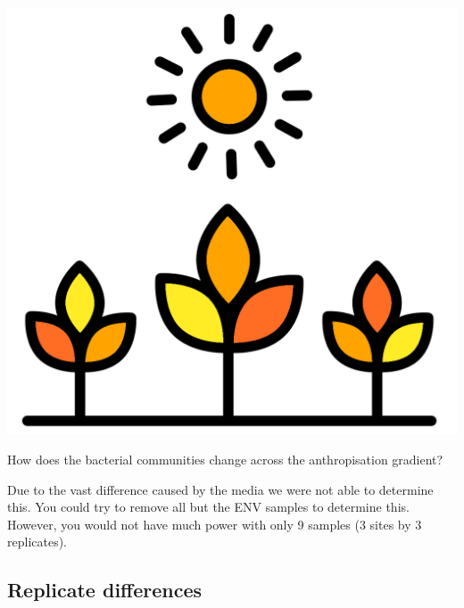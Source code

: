 \documentclass[
]{book}
\begin{document}
\includegraphics{figures/farm.png}

How does the bacterial communities change across the anthropisation gradient?

Due to the vast difference caused by the media we were not able to determine this.
You could try to remove all but the ENV samples to determine this.
However, you would not have much power with only 9 samples (3 sites by 3 replicates).

\hypertarget{replicate-differences}{%
\subsection{Replicate differences}\label{replicate-differences}}
\end{document}
